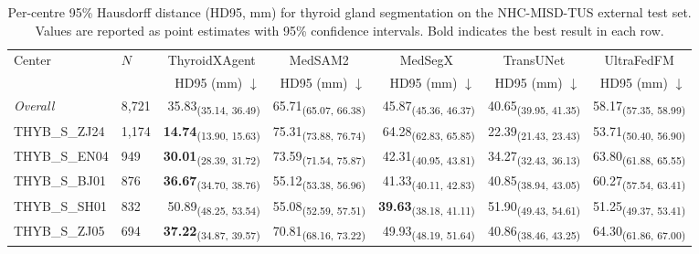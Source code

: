 \begin{table}[p]
\centering
\caption{Per-centre 95\% Hausdorff distance (HD95, mm) for thyroid gland segmentation on the NHC-MISD-TUS external test set. Values are reported as point estimates with 95\% confidence intervals. Bold indicates the best result in each row.}
\label{tab:gland_hd95}
\footnotesize
\setlength{\tabcolsep}{4pt}
\begin{tabular}{llrrrrr}
\toprule
\multirow{2}{*}{Center} & \multirow{2}{*}{$N$} & \multicolumn{1}{c}{ThyroidXAgent} & \multicolumn{1}{c}{MedSAM2} & \multicolumn{1}{c}{MedSegX} & \multicolumn{1}{c}{TransUNet} & \multicolumn{1}{c}{UltraFedFM} \\
\cmidrule(lr){3-3} \cmidrule(lr){4-4} \cmidrule(lr){5-5} \cmidrule(lr){6-6} \cmidrule(lr){7-7}
 & & HD95 (mm) $\downarrow$ & HD95 (mm) $\downarrow$ & HD95 (mm) $\downarrow$ & HD95 (mm) $\downarrow$ & HD95 (mm) $\downarrow$ \\
\midrule
\textit{Overall} & 8,721 & 35.83\textsubscript{(35.14, 36.49)} & 65.71\textsubscript{(65.07, 66.38)} & 45.87\textsubscript{(45.36, 46.37)} & 40.65\textsubscript{(39.95, 41.35)} & 58.17\textsubscript{(57.35, 58.99)} \\
\midrule
THYB\_S\_ZJ24 & 1,174 & \textbf{14.74}\textsubscript{(13.90, 15.63)} & 75.31\textsubscript{(73.88, 76.74)} & 64.28\textsubscript{(62.83, 65.85)} & 22.39\textsubscript{(21.43, 23.43)} & 53.71\textsubscript{(50.40, 56.90)} \\
THYB\_S\_EN04 & 949 & \textbf{30.01}\textsubscript{(28.39, 31.72)} & 73.59\textsubscript{(71.54, 75.87)} & 42.31\textsubscript{(40.95, 43.81)} & 34.27\textsubscript{(32.43, 36.13)} & 63.80\textsubscript{(61.88, 65.55)} \\
THYB\_S\_BJ01 & 876 & \textbf{36.67}\textsubscript{(34.70, 38.76)} & 55.12\textsubscript{(53.38, 56.96)} & 41.33\textsubscript{(40.11, 42.83)} & 40.85\textsubscript{(38.94, 43.05)} & 60.27\textsubscript{(57.54, 63.41)} \\
THYB\_S\_SH01 & 832 & 50.89\textsubscript{(48.25, 53.54)} & 55.08\textsubscript{(52.59, 57.51)} & \textbf{39.63}\textsubscript{(38.18, 41.11)} & 51.90\textsubscript{(49.43, 54.61)} & 51.25\textsubscript{(49.37, 53.41)} \\
THYB\_S\_ZJ05 & 694 & \textbf{37.22}\textsubscript{(34.87, 39.57)} & 70.81\textsubscript{(68.16, 73.22)} & 49.93\textsubscript{(48.19, 51.64)} & 40.86\textsubscript{(38.46, 43.25)} & 64.30\textsubscript{(61.86, 67.00)} \\

\end{tabular}
\end{table}
